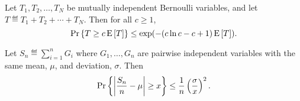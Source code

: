 \documentclass[10pt]{article}
\begin{document}
\begin{theorem*} 
Let $T_1, T_2, \dots, T_N$ be mutually independent Bernoulli variables,
and let $T \eqdef T_1 + T_2 + \cdots + T_N$.  Then for all $c \geq 1$,
\begin{equation}\label{Cher}
\mathop{\textup{Pr}}\nolimits\left\{T \geq c \mathop{\textup{E}}\nolimits\left[T\right]\right\} \leq \textup{exp}(- (c\ln c -c + 1) \mathop{\textup{E}}\nolimits\left[T\right]).
\end{equation}
\end{theorem*}

\begin{theorem*}
Let $S_n \eqdef \sum_{i=1}^n G_i$ where $G_1, \dots, G_n$ are pairwise
independent variables with the same mean, $\mu$, and deviation, $\sigma$.
Then
\begin{equation}\label{Sndev}
\mathop{\textup{Pr}}\nolimits\left\{\left|\frac{S_n}{n} - \mu\right| \geq x\right\} \leq \frac{1}{n}
\left(\frac{\sigma}{x}\right)^2.
\end{equation}
\end{theorem*}
\end{document}
